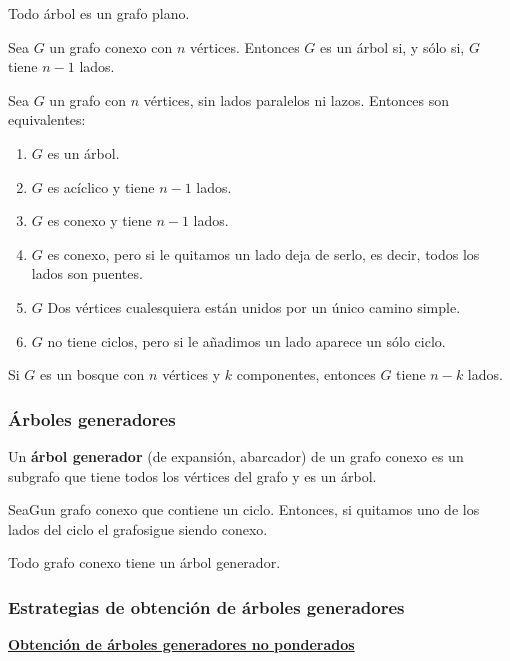 \begin{nth}
    Todo árbol es un grafo plano.
\end{nth}
\begin{ncor}
    Sea $G$ un grafo conexo con $n$ vértices. Entonces $G$ es un árbol si, y sólo si, $G$ tiene $n-1$ lados.
\end{ncor}
\begin{nth}
    Sea $G$ un grafo con $n$ vértices, sin lados paralelos ni lazos. Entonces son equivalentes:
    \begin{enumerate}
        \item $G$ es un árbol.
        \item $G$ es acíclico y tiene $n-1$ lados.
        \item $G$ es conexo y tiene $n-1$ lados.
        \item $G$ es conexo, pero si le quitamos un lado deja de serlo, es decir, todos los lados son puentes.
        \item $G$ Dos vértices cualesquiera están unidos por un único camino simple.
        \item $G$ no tiene ciclos, pero si le añadimos un lado aparece un sólo ciclo.
    \end{enumerate}
\end{nth}
\begin{ncor}
    Si $G$ es un bosque con $n$ vértices y $k$ componentes, entonces $G$ tiene $n-k$ lados.
\end{ncor}

\subsubsection{Árboles generadores}
\begin{ndef}
    Un \textbf{árbol generador} (de expansión, abarcador) de un grafo conexo es un subgrafo que tiene todos los vértices del grafo y es un árbol.
\end{ndef}
\begin{lema}
    SeaGun grafo conexo que contiene un ciclo. Entonces, si quitamos uno de los lados del ciclo el grafosigue siendo conexo.
\end{lema}
\begin{nprop}
    Todo grafo conexo tiene un árbol generador.
\end{nprop}

\subsubsection{Estrategias de obtención de árboles generadores}
\textbf{\underline{Obtención de árboles generadores no ponderados}} \\

